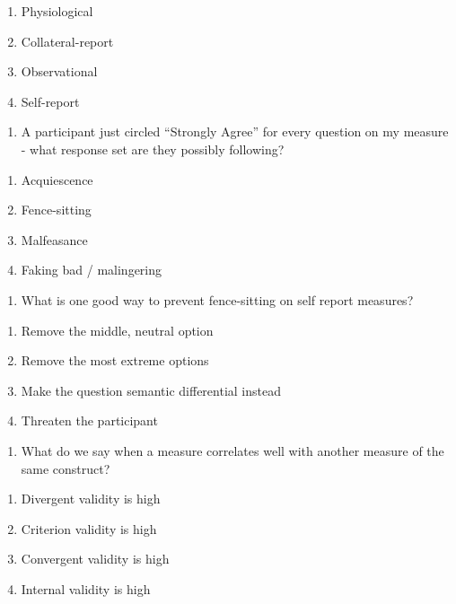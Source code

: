 \documentclass[
  12pt,
  letterpaper,
  DIV=11,
  numbers=noendperiod]{scrartcl}
\providecommand{\tightlist}{%
  \setlength{\itemsep}{0pt}\setlength{\parskip}{0pt}}\usepackage{longtable,booktabs,array}
\begin{document}
\begin{enumerate}
\def\labelenumi{\alph{enumi}.}
\tightlist
\item
  Physiological
\item
  Collateral-report
\item
  Observational
\item
  Self-report
\end{enumerate}

\begin{enumerate}
\def\labelenumi{\arabic{enumi}.}
\setcounter{enumi}{24}
\tightlist
\item
  A participant just circled ``Strongly Agree'' for every question on my
  measure - what response set are they possibly following?
\end{enumerate}

\begin{enumerate}
\def\labelenumi{\alph{enumi}.}
\tightlist
\item
  Acquiescence
\item
  Fence-sitting
\item
  Malfeasance
\item
  Faking bad / malingering
\end{enumerate}

\begin{enumerate}
\def\labelenumi{\arabic{enumi}.}
\setcounter{enumi}{25}
\tightlist
\item
  What is one good way to prevent fence-sitting on self report measures?
\end{enumerate}

\begin{enumerate}
\def\labelenumi{\alph{enumi}.}
\tightlist
\item
  Remove the middle, neutral option
\item
  Remove the most extreme options
\item
  Make the question semantic differential instead
\item
  Threaten the participant
\end{enumerate}

\begin{enumerate}
\def\labelenumi{\arabic{enumi}.}
\setcounter{enumi}{26}
\tightlist
\item
  What do we say when a measure correlates well with another measure of
  the same construct?
\end{enumerate}

\begin{enumerate}
\def\labelenumi{\alph{enumi}.}
\tightlist
\item
  Divergent validity is high
\item
  Criterion validity is high
\item
  Convergent validity is high
\item
  Internal validity is high
\end{enumerate}
\end{document}
